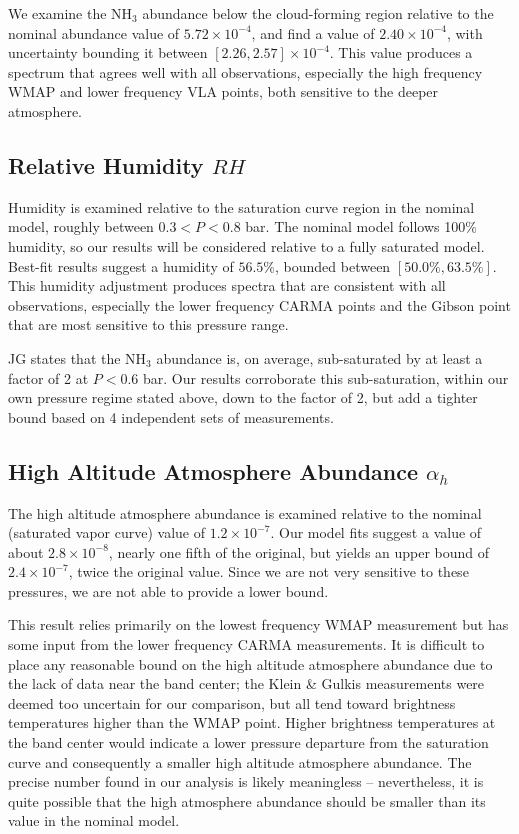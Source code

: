 \documentclass{article}
\newcommand{\e}[1]{\times 10^{#1}}
\begin{document}
	We examine the NH$_{3}$ abundance below the cloud-forming region relative to the nominal abundance value of $5.72\e{-4}$, and find 
	a value of $2.40\e{-4}$, with uncertainty bounding it between $[2.26, 2.57] \e{-4}$.
	This value produces a spectrum that agrees well with all observations, especially the high frequency WMAP and lower frequency VLA points, both sensitive to the deeper atmosphere.

\subsection{Relative Humidity $RH$}

	Humidity is examined relative to the saturation curve region in the nominal model, roughly between $0.3 < P < 0.8$ bar.
	The nominal model follows 100\% humidity, so our results will be considered relative to a fully saturated model.
	Best-fit results suggest a humidity of $56.5\%$, bounded between $[50.0\%, 63.5\%]$.
	This humidity adjustment produces spectra that are consistent with all observations, especially the lower frequency CARMA points and the Gibson point that are most sensitive to this pressure range.

	JG states that the NH$_{3}$ abundance is, on average, sub-saturated by at least a factor of 2 at $P < 0.6$ bar.
	Our results corroborate this sub-saturation, within our own pressure regime stated above, down to the factor of 2, but add a tighter bound based on 4 independent sets of measurements.


\subsection{High Altitude Atmosphere Abundance $\alpha_{h}$}

	The high altitude atmosphere abundance is examined relative to the nominal (saturated vapor curve) value of $1.2\e{-7}$.
	Our model fits suggest a value of about $2.8\e{-8}$, nearly one fifth of the original, but yields an upper bound of $2.4\e{-7}$, twice the original value.
	Since we are not very sensitive to these pressures, we are not able to provide a lower bound.

	This result relies primarily on the lowest frequency WMAP measurement but has some input from the lower frequency CARMA measurements.
	It is difficult to place any reasonable bound on the high altitude atmosphere abundance due to the lack of data near the band center; the Klein \& Gulkis measurements were deemed too uncertain for our comparison, but all tend toward brightness temperatures higher than the WMAP point.
	Higher brightness temperatures at the band center would indicate a lower pressure departure from the saturation curve and consequently a smaller high altitude atmosphere abundance.
	The precise number found in our analysis is likely meaningless -- nevertheless, it is quite possible that the high atmosphere abundance should be smaller than its value in the nominal model.
\end{document}
